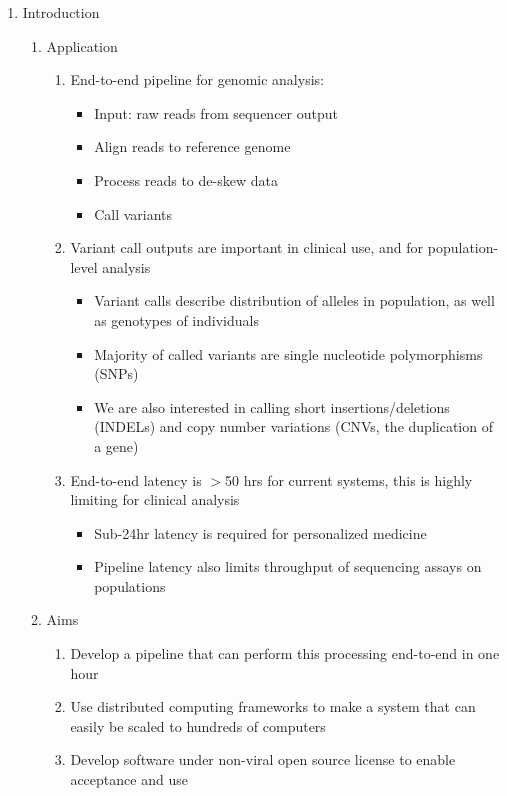 \documentclass[11pt]{article}
\begin{document}
\begin{enumerate}
\item Introduction
\begin{enumerate}
\item Application
\begin{enumerate}
\item End-to-end pipeline for genomic analysis:
\begin{itemize}
\item Input: raw reads from sequencer output
\item Align reads to reference genome
\item Process reads to de-skew data
\item Call variants
\end{itemize}
\item Variant call outputs are important in clinical use, and for population-level analysis
\begin{itemize}
\item Variant calls describe distribution of alleles in population, as well as genotypes of individuals
\item Majority of called variants are single nucleotide polymorphisms (SNPs)
\item We are also interested in calling short insertions/deletions (INDELs) and copy number variations (CNVs, the duplication of a gene)
\end{itemize}
\item End-to-end latency is $>$50 hrs for current systems, this is highly limiting for clinical analysis
\begin{itemize}
\item Sub-24hr latency is required for personalized medicine
\item Pipeline latency also limits throughput of sequencing assays on populations
\end{itemize}
\end{enumerate}
\item Aims
\begin{enumerate}
\item Develop a pipeline that can perform this processing end-to-end in one hour
\item Use distributed computing frameworks to make a system that can easily be scaled to hundreds of computers
\item Develop software under non-viral open source license to enable acceptance and use
\end{enumerate}
\end{enumerate}

\end{enumerate}
\end{document}
